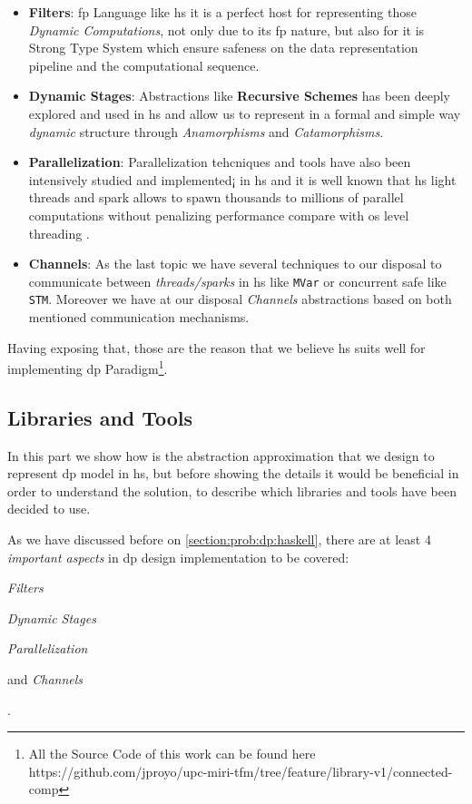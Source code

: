 \documentclass[preprint]{elsarticle}
\begin{document}
\begin{itemize}
    \item \textbf{Filters}: \acrfull{fp} Language like \acrshort{hs} it is a perfect host for representing those \textit{Dynamic Computations}, not only due to its \acrshort{fp} nature, but also for it is Strong Type System which ensure safeness on the data representation pipeline and the computational sequence.
    \item \textbf{Dynamic Stages}\label{dyn:stage}: Abstractions like \textbf{Recursive Schemes} \citep{lenses} has been deeply explored and used in \acrshort{hs} and allow us to represent in a formal and simple way \textit{dynamic} structure through \textit{Anamorphisms} and \textit{Catamorphisms}.
    \item \textbf{Parallelization}: Parallelization tehcniques and tools have also been intensively studied and implemented¡ in \acrshort{hs} \citep{monadpar} and it is well known that \acrshort{hs} light threads and spark allows to spawn thousands to millions of parallel computations without penalizing performance compare with \acrfull{os} level threading \citep{parallelbook}.
    \item \textbf{Channels}: As the last topic we have several techniques to our disposal to communicate between \textit{threads/sparks} in \acrshort{hs} like \texttt{MVar} or concurrent safe like \texttt{STM}. Moreover we have at our disposal \textit{Channels} abstractions based on both mentioned communication mechanisms. 
\end{itemize}

Having exposing that, those are the reason that we believe \acrshort{hs} suits well for implementing \acrshort{dp} Paradigm\footnote{All the Source Code of this work can be found here https://github.com/jproyo/upc-miri-tfm/tree/feature/library-v1/connected-comp}.

\subsection{Libraries and Tools}\label{sub:lib:tools}
In this part we show how is the abstraction approximation that we design to represent \acrshort{dp} model in \acrshort{hs}, but before showing the details it would be beneficial in order to understand the solution, to describe which libraries and tools have been decided to use.

As we have discussed before on \autoref{section:prob:dp:haskell}, there are at least 4 \emph{important aspects} in \acrshort{dp} design implementation to be covered: \begin{inparaenum}[i\upshape)]
\item \emph{Filters}
\item \emph{Dynamic Stages}
\item \emph{Parallelization}
\item and \emph{Channels}
 \end{inparaenum}.
\end{document}
